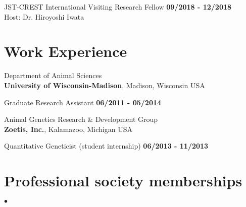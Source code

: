 \documentclass[margin,line,10pt]{res}
\newenvironment{list2}{
  \begin{list}{$\bullet$}{%
      \setlength{\itemsep}{0in}
      \setlength{\parsep}{0in} \setlength{\parskip}{0in}
      \setlength{\topsep}{0in} \setlength{\partopsep}{0in} 
      \setlength{\leftmargin}{0.2in}}}{\end{list}}
\begin{document}
\begin{resume}
JST-CREST International Visiting Research Fellow  \hfill {\bf 09/2018 - 12/2018}\\
Host: Dr. Hiroyoshi Iwata


  


\vspace{0.4cm}
\section{\sc Work \phantom{1cm} Experience}
Department of Animal Sciences\\
{\bf University of Wisconsin-Madison}, Madison, Wisconsin USA
\vspace{-.35cm}

Graduate Research Assistant   \hfill {\bf 06/2011 - 05/2014}\\
\vspace{-.4cm}

Animal Genetics Research \& Development  Group \\
{\bf Zoetis, Inc.}, Kalamazoo, Michigan USA

\vspace{-.35cm}

Quantitative Geneticist (student internship)   \hfill {\bf 06/2013 - 11/2013}\\








\vspace{0.5cm}
\section{\sc Professional society memberships}
\begin{list2}
 


\end{list2}
\end{resume}
\end{document}
